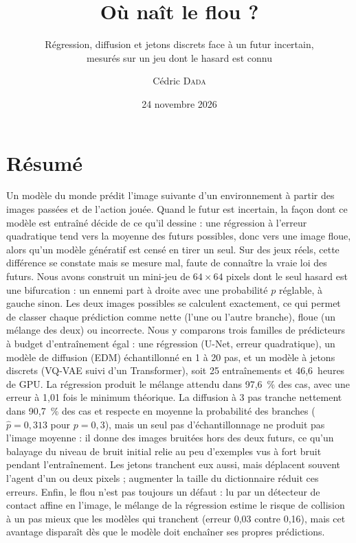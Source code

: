 \documentclass[a4paper, 11pt]{article}
\title{Où naît le flou ?}
\subtitle{Régression, diffusion et jetons discrets face à un futur incertain, \\ mesurés sur un jeu dont le hasard est connu}
\author{Cédric \textsc{Dada}}
\date{24 novembre 2026}
\newcommand{\phat}{\hat p}
\begin{document}
\maketitle

\section*{Résumé}

Un modèle du monde prédit l'image suivante d'un environnement à partir des images passées et de l'action jouée. Quand le
futur est incertain, la façon dont ce modèle est entraîné décide de ce qu'il dessine : une régression à l'erreur
quadratique tend vers la moyenne des futurs possibles, donc vers une image floue, alors qu'un modèle génératif est censé
en tirer un seul. Sur des jeux réels, cette différence se constate mais se mesure mal, faute de connaître la vraie loi des
futurs. Nous avons construit un mini-jeu de $64\times64$ pixels dont le seul hasard est une bifurcation : un ennemi part à
droite avec une probabilité $p$ réglable, à gauche sinon. Les deux images possibles se calculent exactement, ce qui permet
de classer chaque prédiction comme nette (l'une ou l'autre branche), floue (un mélange des deux) ou incorrecte. Nous y
comparons trois familles de prédicteurs à budget d'entraînement égal : une régression (U-Net, erreur quadratique), un modèle
de diffusion (EDM) échantillonné en 1 à 20 pas, et un modèle à jetons discrets (VQ-VAE suivi d'un Transformer), soit
25 entraînements et 46,6~heures de GPU. La régression produit le mélange attendu dans 97,6~\% des cas, avec une erreur à
1,01 fois le minimum théorique. La diffusion à 3 pas tranche nettement dans 90,7~\% des cas et respecte en moyenne la
probabilité des branches ($\phat = 0{,}313$ pour $p = 0{,}3$), mais un seul pas d'échantillonnage ne produit pas l'image
moyenne : il donne des images bruitées hors des deux futurs, ce qu'un balayage du niveau de bruit initial relie au peu
d'exemples vus à fort bruit pendant l'entraînement. Les jetons tranchent eux aussi, mais déplacent souvent l'agent d'un ou
deux pixels ; augmenter la taille du dictionnaire réduit ces erreurs. Enfin, le flou n'est pas toujours un défaut : lu par un
détecteur de contact affine en l'image, le mélange de la régression estime le risque de collision à un pas mieux que les
modèles qui tranchent (erreur 0,03 contre 0,16), mais cet avantage disparaît dès que le modèle doit enchaîner ses propres
prédictions.

\vspace{1em}
\tableofcontents
\newpage
\end{document}
